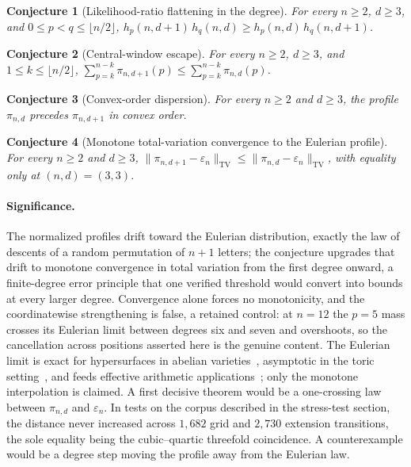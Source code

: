 \documentclass[11pt]{article}
\newtheorem{conjecture}{Conjecture}
\theoremstyle{definition}
\begin{document}
\begin{conjecture}[Likelihood-ratio flattening in the degree]\label{ae12}
For every $n\ge2$, $d\ge3$, and $0\le p<q\le\lfloor n/2\rfloor$, $h_p(n,d+1)\,h_q(n,d)\ge h_p(n,d)\,h_q(n,d+1)$.
\end{conjecture}

\begin{conjecture}[Central-window escape]\label{ae13}
For every $n\ge2$, $d\ge3$, and $1\le k\le\lfloor n/2\rfloor$, $\sum_{p=k}^{n-k}\pi_{n,d+1}(p)\le\sum_{p=k}^{n-k}\pi_{n,d}(p)$.
\end{conjecture}

\begin{conjecture}[Convex-order dispersion]\label{ae14}
For every $n\ge2$ and $d\ge3$, the profile $\pi_{n,d}$ precedes $\pi_{n,d+1}$ in convex order.
\end{conjecture}

\begin{conjecture}[Monotone total-variation convergence to the Eulerian profile]\label{ae15}
For every $n\ge2$ and $d\ge3$, $\|\pi_{n,d+1}-\varepsilon_n\|_{\mathrm{TV}}\le\|\pi_{n,d}-\varepsilon_n\|_{\mathrm{TV}}$, with equality only at $(n,d)=(3,3)$.
\end{conjecture}

\paragraph{Significance.}
The normalized profiles drift toward the Eulerian distribution, exactly the law of descents of a random permutation of $n+1$ letters; the conjecture upgrades that drift to monotone convergence in total variation from the first degree onward, a finite-degree error principle that one verified threshold would convert into bounds at every larger degree.  Convergence alone forces no monotonicity, and the coordinatewise strengthening is false, a retained control: at $n=12$ the $p=5$ mass crosses its Eulerian limit between degrees six and seven and overshoots, so the cancellation across positions asserted here is the genuine content.  The Eulerian limit is exact for hypersurfaces in abelian varieties~\cite{LS25}, asymptotic in the toric setting~\cite{DK86}, and feeds effective arithmetic applications~\cite{Ji24}; only the monotone interpolation is claimed.  A first decisive theorem would be a one-crossing law between $\pi_{n,d}$ and $\varepsilon_n$.  In tests on the corpus described in the stress-test section, the distance never increased across $1{,}682$ grid and $2{,}730$ extension transitions, the sole equality being the cubic--quartic threefold coincidence.  A counterexample would be a degree step moving the profile away from the Eulerian law.
\end{document}
